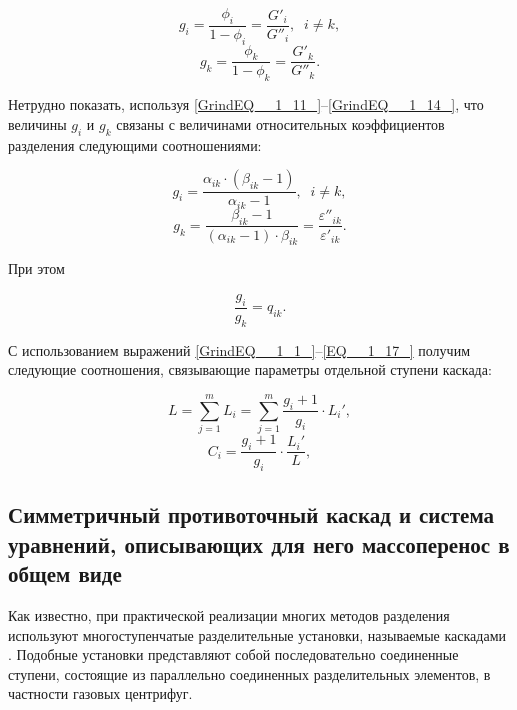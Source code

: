 \begin{equation} \label{GrindEQ__1_13_} 
  g_{i} =\frac{\phi _{i} }{1-\phi _{i} } =\frac{G'_{i} }{G''_{i} } ,\; \; i\ne k, 
  \end{equation} 
  \begin{equation} \label{GrindEQ__1_14_} 
  g_{k} =\frac{\phi _{k} }{1-\phi _{k} } =\frac{G'_{k} }{G''_{k} } .           
\end{equation} 

Нетрудно показать, используя \ref{GrindEQ__1_11_}--\ref{GrindEQ__1_14_}, что величины $g_{i}$ и $g_{k}$  связаны с величинами относительных коэффициентов разделения следующими соотношениями:

\begin{equation} \label{EQ__1_15_} 
  g_{i} =\frac{\alpha _{ik}  \cdot (\beta _{ik} -1)}{\alpha _{ik} -1} ,\; \; i\ne k,           
  \end{equation} 
  \begin{equation} \label{EQ__1_16_} 
  g_{k} =\frac{\beta _{ik} -1}{(\alpha _{ik} -1) \cdot \beta _{ik} } =\frac{\varepsilon ''_{ik} }{\varepsilon '_{ik} } . 
\end{equation} 

При этом

\begin{equation} \label{EQ__1_17_} 
  \frac{g_{i} }{g_{k} } =q_{ik} .           
\end{equation} 

С использованием выражений \ref{GrindEQ__1_1_}--\ref{EQ__1_17_} получим следующие соотношения, связывающие параметры отдельной ступени каскада:

\begin{equation} \label{GrindEQ__1_18_} 
  L=\sum _{j=1}^{m}L_{i}  =\sum _{j=1}^{m}\frac{g_{i} +1}{g_{i} } \cdot L_{i} ',               
  \end{equation} 
  \begin{equation} \label{GrindEQ__1_19_} 
  C_{i} =\frac{g_{i} +1}{g_{i} } \cdot \frac{L_{i} '}{L} ,         
\end{equation}   

\subsection{Симметричный противоточный каскад и система уравнений, описывающих для него массоперенос в общем виде}

Как известно, при практической реализации многих методов разделения используют многоступенчатые разделительные установки, называемые каскадами \cite{sulaberidzeTeoriyaKaskadovDlya2011}. Подобные установки представляют собой последовательно соединенные ступени, состоящие из параллельно соединенных разделительных элементов, в частности газовых центрифуг.

